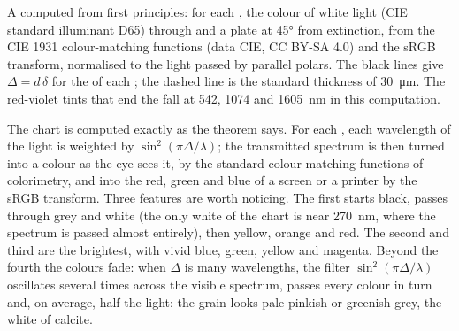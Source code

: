 \begin{omfigure}
{\small A  computed from first principles: for each
, the colour of white light (CIE standard illuminant D65) through
 and a plate at \ang{45} from extinction, from the CIE 1931
colour-matching functions (data \textcopyright{} CIE, CC BY-SA 4.0) and the
sRGB transform, normalised to the light passed by parallel polars. The black
lines give $\Delta = d\,\delta$ for the  of each ; the
dashed line is the standard thickness of \qty{30}{\micro m}. The red-violet
tints that end the  fall at 542, 1074 and \qty{1605}{nm} in this
computation.}
\end{omfigure}

The chart is computed exactly as the theorem says. For each , each
wavelength of the light is weighted by $\sin^2(\pi\Delta/\lambda)$; the
transmitted spectrum is then turned into a colour as the eye sees it, by the
standard colour-matching functions of colorimetry, and into the red, green
and blue of a screen or a printer by the sRGB transform. Three features are
worth noticing. The first  starts black, passes through grey and white
(the only white of the chart is near \qty{270}{nm}, where the spectrum is
passed almost entirely), then yellow, orange and red. The second and third
 are the brightest, with vivid blue, green, yellow and magenta. Beyond
the fourth  the colours fade: when $\Delta$ is many wavelengths, the
filter $\sin^2(\pi\Delta/\lambda)$ oscillates several times across the
visible spectrum, passes every colour in turn and, on average, half the
light: the grain looks pale pinkish or greenish grey, the  white of
calcite.

